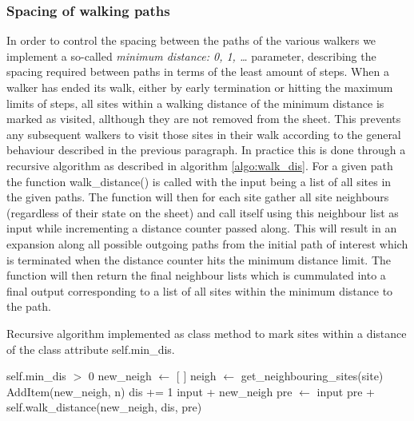 \subsubsection{Spacing of walking paths} %
In order to control the spacing between the paths of the various walkers we
implement a so-called \textit{minimum distance: 0, 1, \ldots} parameter,
describing the spacing required between paths in terms of the least amount of
steps. When a walker has ended its walk, either by early termination or hitting
the maximum limits of steps, all sites within a walking distance of the minimum
distance is marked as visited, allthough they are not removed from the sheet.
This prevents any subsequent walkers to visit those sites in their walk
according to the general behaviour described in the
previous paragraph. In practice this is done through a recursive algorithm as described in algorithm \ref{algo:walk_dis}. For a given path the function walk\_distance() is called with the input being a list of all sites in the given paths. The function will then for each site gather all site neighbours (regardless of their state on the sheet) and call itself using this neighbour list as input while incrementing a distance counter passed along. This will result in an expansion along all possible outgoing paths from the initial path of interest which is terminated when the distance counter hits the minimum distance limit. The function will then return the final neighbour lists which is cummulated into a final output corresponding to a list of all sites within the minimum distance to the path.

\begin{algorithm}[H]
  \caption{Recursive algorithm implemented as class method to mark sites within a distance of the class attribute self.min\_dis.}
  \label{algo:walk_dis}
  \begin{algorithmic}[1]
    \Require self.min\_dis $>$ 0 
      \State new\_neigh $\gets$ [ ] 
        \State neigh $\gets$ get\_neighbouring\_sites(site) 
           
            \State AddItem(new\_neigh, n)
          \EndIf
        \EndFor
      \EndFor
      \State dis += 1 
       
        \State \Return input + new\_neigh 
      \Else {}
        \State pre $\gets$ input
        \State \Return pre +  self.walk\_distance(new\_neigh, dis, pre)
      \EndIf
    \EndFunction
  \end{algorithmic}
\end{algorithm}


